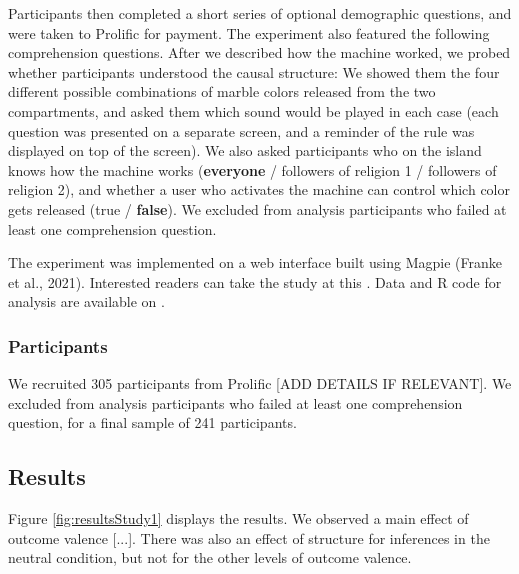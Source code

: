 \documentclass[fleqn,reqno,10pt]{article}
\begin{document}
Participants then completed a short series of optional demographic questions, and were taken to Prolific for payment. The experiment also featured the following comprehension questions. After we described how the machine worked, we probed whether participants understood the causal structure: We showed them the four different possible combinations of marble colors released from the two compartments, and asked them which sound would be played in each case (each question was presented on a separate screen, and a reminder of the rule was displayed on top of the screen). We also asked participants who on the island knows how the machine works (\textbf{everyone} / followers of religion 1 / followers of religion 2), and whether a user who activates the machine can control which color gets released (true / \textbf{false}). We excluded from analysis participants who failed at least one comprehension question.

The experiment was implemented on a web interface built using Magpie (Franke et al., 2021). Interested readers can take the study at this \href{https://magpie-ea.github.io/magpie3-inferences-from-causal-attribution/}{\color{blue}{link}}. Data and R code for analysis are available on \href{https://github.com/magpie-ea/magpie3-inferences-from-causal-attribution}{\color{blue}{Github}}.\\


\subsubsection{Participants}
We recruited 305 participants from Prolific [ADD DETAILS IF RELEVANT]. We excluded from analysis participants who failed at least one comprehension question, for a final sample of 241 participants.

\subsection{Results}

Figure \ref{fig:resultsStudy1} displays the results. We observed a main effect of outcome valence [...]. There was also an effect of structure for inferences in the neutral condition, but not for the other levels of outcome valence.
\end{document}
